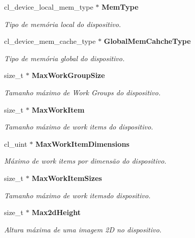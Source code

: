 \begin{DoxyCompactItemize}
\mbox{\label{structdevices_a0453d0dbf9d90d86ecb62c5cb23cbf5c}} 
cl\+\_\+device\+\_\+local\+\_\+mem\+\_\+type $\ast$ \textbf{ Mem\+Type}
\begin{DoxyCompactList}\small\item\em Tipo de memória local do dispositivo. \end{DoxyCompactList}\item 
\mbox{\label{structdevices_a93e65d571bcd11132e2f93ae2f3062ca}} 
cl\+\_\+device\+\_\+mem\+\_\+cache\+\_\+type $\ast$ \textbf{ Global\+Mem\+Cahche\+Type}
\begin{DoxyCompactList}\small\item\em Tipo de memória global do dispositivo. \end{DoxyCompactList}\item 
\mbox{\label{structdevices_a77489d32adab13bba6b5b38f1f4505ee}} 
size\+\_\+t $\ast$ \textbf{ Max\+Work\+Group\+Size}
\begin{DoxyCompactList}\small\item\em Tamanho máximo de Work Groups do dispositivo. \end{DoxyCompactList}\item 
\mbox{\label{structdevices_aa500c0395fbaacdcfb07c6fb48b09c57}} 
size\+\_\+t $\ast$ \textbf{ Max\+Work\+Item}
\begin{DoxyCompactList}\small\item\em Tamanho máximo de work items do dispositivo. \end{DoxyCompactList}\item 
\mbox{\label{structdevices_af3747549c39fc0c0ce1dfe8c9ebf402a}} 
cl\+\_\+uint $\ast$ \textbf{ Max\+Work\+Item\+Dimensions}
\begin{DoxyCompactList}\small\item\em Máximo de work items por dimensão do dispositivo. \end{DoxyCompactList}\item 
\mbox{\label{structdevices_af79cf84f1d71d8481d3e04a79294d0ed}} 
size\+\_\+t $\ast$ \textbf{ Max\+Work\+Item\+Sizes}
\begin{DoxyCompactList}\small\item\em Tamanho máximo de work itemsdo dispositivo. \end{DoxyCompactList}\item 
\mbox{\label{structdevices_add04e0f60e2a9e3f67cceca10f8c3685}} 
size\+\_\+t $\ast$ \textbf{ Max2d\+Height}
\begin{DoxyCompactList}\small\item\em Altura máxima de uma imagem 2D no dispositivo. \end{DoxyCompactList}\item 

\end{DoxyCompactItemize}
